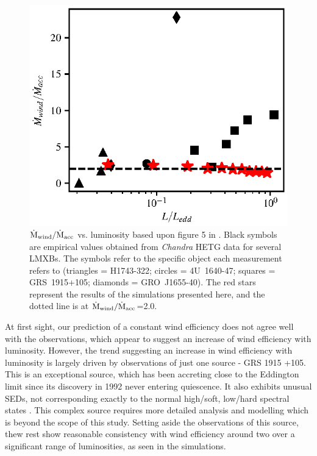 \documentclass[a4paper,fleqn,usenatbib]{mnras}
\begin{document}
\begin{figure}
\includegraphics[width=\columnwidth]{figures/ponti.eps}
\caption{$\rm{\dot{M}_{wind}/\dot{M}_{acc}}$ vs. luminosity based upon figure 5 in \citet{2012MNRAS.422L..11P}. 
Black symbols are empirical values obtained from {\em Chandra} HETG data for several LMXBs. 
The symbols refer to the specific object each measurement refers to 
(triangles = H1743-322; circles = 4U~1640-47; squares = GRS~1915+105; diamonds = GRO~J1655-40). 
The red stars represent the results of the simulations presented here, and the dotted line
is at $\rm{\dot{M}_{wind}/\dot{M}_{acc}}$=2.0.}
\label{figure:mdot_vs_lum}
\end{figure}

At first sight, our prediction of a constant wind efficiency does not
agree well with the observations, which appear to suggest an increase of wind efficiency with
luminosity. However, the trend suggesting an increase in wind efficiency with luminosity is largely driven 
by observations of just one source - GRS 1915 +105.  This is an exceptional source, which has been 
accreting close to the Eddington limit since its discovery in 1992 \citep{1994ApJS...92..469C,
2017MNRAS.468.4748C} never
entering quiescence. It also exhibits unusual SEDs, not corresponding exactly to the normal high/soft,
low/hard spectral states \cite{2016ApJ...833..165Z}. This complex source requires more detailed
analysis and modelling which is beyond the scope of this study. Setting aside the observations of this
source, thew rest show reasonable consistency with wind efficiency around two over a significant 
range of luminosities, as seen in the simulations.
\end{document}
